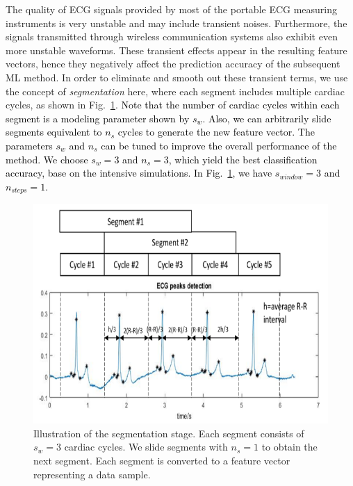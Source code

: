 The quality of ECG signals provided by most of the portable ECG measuring instruments is very unstable and may include transient noises. Furthermore, the signals transmitted through wireless communication systems also exhibit even more unstable waveforms. These transient effects appear in the resulting feature vectors, hence they negatively affect the prediction accuracy of the subsequent ML method. In order to eliminate and smooth out these transient terms, we use the concept of \textit{segmentation} here, where each segment includes multiple cardiac cycles, 
as shown in Fig.~\ref{fig:interval}. \textcolor{black}{Note that the number of cardiac cycles within each segment is a modeling parameter shown by $s_{w}$. Also, we can arbitrarily slide segments equivalent to $n_{s}$ cycles to generate the new feature vector. The parameters $s_{w}$ and $n_{s}$ can be tuned to improve the overall performance of the method. We choose $s_{w}=3$ and $n_{s}=3$, which yield the best classification accuracy, base on the intensive simulations. In Fig.~\ref{fig:interval}, we have $s_{window}=3$ and $n_{steps}=1$.}

\begin{figure}[t]
	\centering
	\includegraphics[scale=.8]{Fig/segment.png}
	\caption{Illustration of the segmentation stage. Each segment consists of $s_w=3$ cardiac cycles. We slide segments with $n_s=1$ to obtain the next segment. Each segment is converted to a feature vector representing a data sample.}
	\label{fig:interval}
\end{figure}


